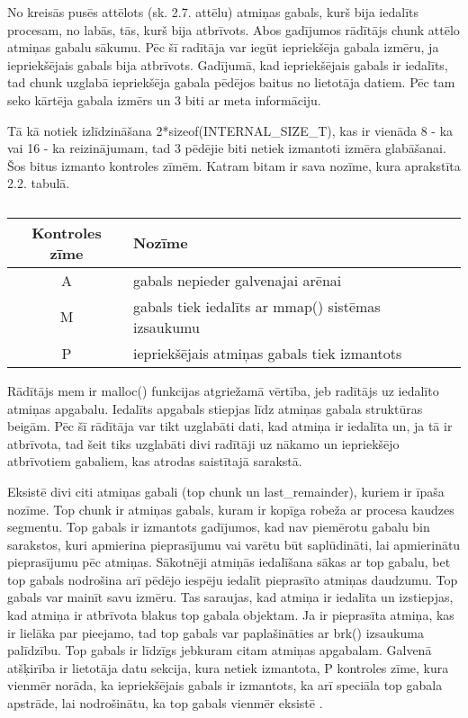 No kreisās pusēs  attēlots (sk. 2.7. attēlu) \cite{CHOFM} atmiņas gabals, kurš bija iedalīts procesam, no labās, tās, kurš bija atbrīvots.
Abos gadījumos rādītājs chunk attēlo atmiņas gabalu sākumu. Pēc šī radītāja var iegūt iepriekšēja gabala izmēru, ja iepriekšējais gabals bija atbrīvots.
Gadījumā, kad iepriekšējais gabals ir iedalīts, tad chunk uzglabā iepriekšēja gabala pēdējos baitus no lietotāja datiem. 
Pēc tam seko kārtēja gabala izmērs un 3 biti ar meta informāciju. 



Tā kā notiek izlīdzināšana 2*sizeof(INTERNAL\_SIZE\_T), kas ir vienāda 8 - ka vai 16 - ka  reizinājumam, tad 3 pēdējie biti netiek izmantoti izmēra glabāšanai. 
Šos bitus izmanto kontroles zīmēm. Katram bitam ir sava nozīme, kura aprakstīta 2.2. tabulā.

  \begin{table}[H]
\caption{\textbf{\fontsize{11}{12}\selectfont {\\ Atmiņas gabala kontroles zīmes}}} 
\label{table:kysymys}
\centering
	\begin{tabular}{|c|l|r|p{5cm}|}
	  \hline
	Kontroles zīme & Nozīme \\
	\hline
	  A & gabals nepieder galvenajai arēnai \\
      \hline
      M & gabals tiek iedalīts ar mmap() sistēmas izsaukumu \\
      \hline
      P & iepriekšējais atmiņas gabals tiek izmantots  \\
    \hline
	\end{tabular}
\end{table}

Rādītājs mem ir malloc() funkcijas atgriežamā vērtība, jeb radītājs uz iedalīto atmiņas apgabalu. Iedalīts apgabals stiepjas līdz atmiņas gabala struktūras beigām.
Pēc šī rādītāja var tikt uzglabāti dati, kad atmiņa ir iedalīta un, ja tā ir atbrīvota, tad šeit tiks uzglabāti divi radītāji uz nākamo un iepriekšējo atbrīvotiem gabaliem, kas atrodas saistītajā sarakstā. 


Eksistē divi citi atmiņas gabali (top chunk un last\_remainder), kuriem ir īpaša nozīme. 
Top chunk ir atmiņas gabals, kuram ir kopīga robeža ar procesa kaudzes segmentu.
Top gabals ir izmantots gadījumos, kad nav piemērotu gabalu bin sarakstos, kuri apmierina pieprasījumu vai varētu būt saplūdināti, lai apmierinātu pieprasījumu pēc atmiņas.
Sākotnēji atmiņās iedalīšana sākas ar top gabalu, bet top gabals nodrošina arī pēdējo iespēju iedalīt pieprasīto atmiņas daudzumu.
Top gabals var mainīt savu izmēru. Tas saraujas, kad atmiņa ir iedalīta un izstiepjas, kad atmiņa ir atbrīvota blakus top gabala objektam. 
Ja ir pieprasīta atmiņa, kas ir lielāka par pieejamo, tad top gabals var paplašināties ar brk() izsaukuma palīdzību.
Top gabals ir līdzīgs jebkuram citam atmiņas apgabalam. 
Galvenā atšķirība ir lietotāja datu sekcija, kura netiek izmantota, P kontroles zīme, kura vienmēr norāda, ka iepriekšējais gabals ir izmantots, ka arī speciāla top gabala apstrāde, lai nodrošinātu, ka top gabals vienmēr eksistē \cite {BLACKHAT}.

